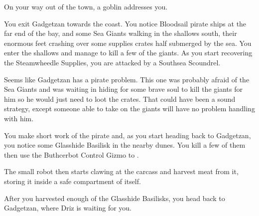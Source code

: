 


On your way out of the town, a goblin addresses you.


You exit Gadgetzan towards the coast. You notice Bloodsail pirate ships at the far end of the bay, and some Sea Giants walking in the shallows south, their enormous feet crashing over some supplies crates half submerged by the sea. You enter the shallows and manage to kill a few of the giants. As you start recovering the Steamwheedle Supplies, you are attacked by a Southsea Scoundrel.


Seems like Gadgetzan has a pirate problem. This one was probably afraid of the Sea Giants and was waiting in hiding for some brave soul to kill the giants for him so he would just need to loot the crates. That could have been a sound strategy, except someone able to take on the giants will have no problem handling with him.

You make short work of the pirate and, as you start heading back to Gadgetzan, you notice some Glasshide Basilisk in the nearby dunes. You kill a few of them then use the Buthcerbot Control Gizmo to .  %


The small robot then starts clawing at the carcass and harvest meat from it, storing it inside a safe compartment of itself.

After you harvested enough of the Glasshide Basilisks, you head back to Gadgetzan, where Driz is waiting for you.


